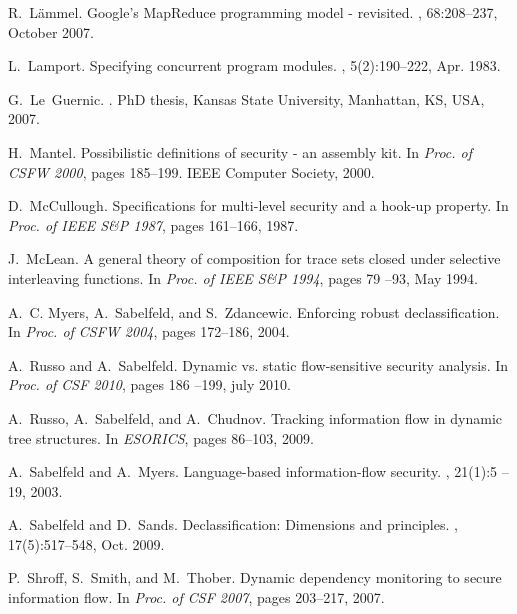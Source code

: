 \documentclass[10pt,a4paper,oneside]{article}
\begin{document}
\begin{thebibliography}{10}
R.~L\"{a}mmel.
\newblock Google's {MapReduce} programming model - revisited.
, 68:208--237, October 2007.

L.~Lamport.
\newblock Specifying concurrent program modules.
,
  5(2):190--222, Apr. 1983.

G.~Le~Guernic.
.
\newblock PhD thesis, Kansas State University, Manhattan, KS, USA, 2007.

H.~Mantel.
\newblock Possibilistic definitions of security - an assembly kit.
\newblock In {\em Proc. of CSFW 2000}, pages 185--199. IEEE Computer Society,
  2000.

D.~McCullough.
\newblock Specifications for multi-level security and a hook-up property.
\newblock In {\em Proc. of IEEE S\&P 1987}, pages 161--166, 1987.

J.~McLean.
\newblock A general theory of composition for trace sets closed under selective
  interleaving functions.
\newblock In {\em Proc. of IEEE S\&P 1994}, pages 79 --93, May 1994.

A.~C. Myers, A.~Sabelfeld, and S.~Zdancewic.
\newblock Enforcing robust declassification.
\newblock In {\em Proc. of CSFW 2004}, pages 172--186, 2004.

A.~Russo and A.~Sabelfeld.
\newblock Dynamic vs. static flow-sensitive security analysis.
\newblock In {\em Proc. of CSF 2010}, pages 186 --199, july 2010.

A.~Russo, A.~Sabelfeld, and A.~Chudnov.
\newblock Tracking information flow in dynamic tree structures.
\newblock In {\em ESORICS}, pages 86--103, 2009.

A.~Sabelfeld and A.~Myers.
\newblock Language-based information-flow security.
, 21(1):5 --
  19, 2003.

A.~Sabelfeld and D.~Sands.
\newblock Declassification: Dimensions and principles.
, 17(5):517--548, Oct. 2009.

P.~Shroff, S.~Smith, and M.~Thober.
\newblock Dynamic dependency monitoring to secure information flow.
\newblock In {\em Proc. of CSF 2007}, pages 203--217, 2007.


\end{thebibliography}
\end{document}
